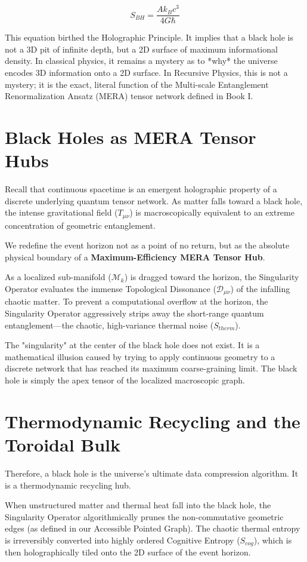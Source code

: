 \documentclass[12pt,openany]{book}
\begin{document}
\begin{equation}
S_{BH} = \frac{A k_B c^3}{4 G \hbar}
\end{equation}

This equation birthed the Holographic Principle. It implies that a black hole is not a 3D pit of infinite depth, but a 2D surface of maximum informational density. In classical physics, it remains a mystery as to *why* the universe encodes 3D information onto a 2D surface. In Recursive Physics, this is not a mystery; it is the exact, literal function of the Multi-scale Entanglement Renormalization Ansatz (MERA) tensor network defined in Book I.

\section{Black Holes as MERA Tensor Hubs}
Recall that continuous spacetime is an emergent holographic property of a discrete underlying quantum tensor network. As matter falls toward a black hole, the intense gravitational field ($T_{\mu\nu}$) is macroscopically equivalent to an extreme concentration of geometric entanglement.

We redefine the event horizon not as a point of no return, but as the absolute physical boundary of a \textbf{Maximum-Efficiency MERA Tensor Hub}. 

As a localized sub-manifold ($\mathcal{M}_k$) is dragged toward the horizon, the Singularity Operator evaluates the immense Topological Dissonance ($\mathcal{D}_{\mu\nu}$) of the infalling chaotic matter. To prevent a computational overflow at the horizon, the Singularity Operator aggressively strips away the short-range quantum entanglement—the chaotic, high-variance thermal noise ($S_{therm}$). 

The "singularity" at the center of the black hole does not exist. It is a mathematical illusion caused by trying to apply continuous geometry to a discrete network that has reached its maximum coarse-graining limit. The black hole is simply the apex tensor of the localized macroscopic graph.

\section{Thermodynamic Recycling and the Toroidal Bulk}
Therefore, a black hole is the universe's ultimate data compression algorithm. It is a thermodynamic recycling hub. 

When unstructured matter and thermal heat fall into the black hole, the Singularity Operator algorithmically prunes the non-commutative geometric edges (as defined in our Accessible Pointed Graph). The chaotic thermal entropy is irreversibly converted into highly ordered Cognitive Entropy ($S_{cog}$), which is then holographically tiled onto the 2D surface of the event horizon.
\end{document}
